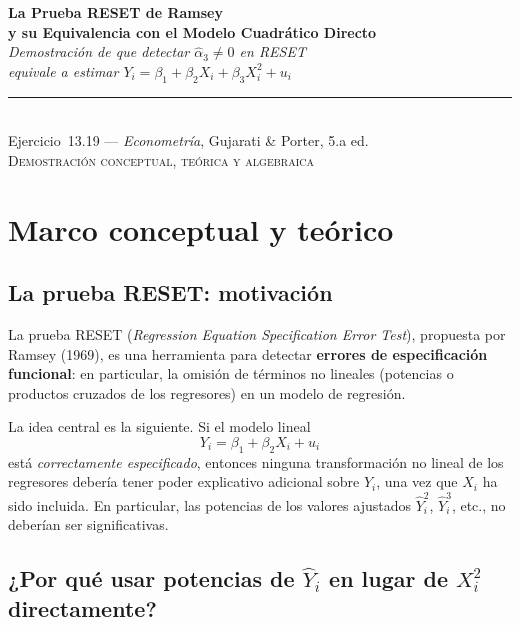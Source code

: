 \documentclass[12pt, letterpaper]{article}
\begin{document}
\begin{center}
  {\LARGE\bfseries La Prueba RESET de Ramsey}\\[6pt]
  {\LARGE\bfseries y su Equivalencia con el Modelo Cuadrático Directo}\\[12pt]
  {\large\itshape Demostración de que detectar $\hat{\alpha}_3 \neq 0$ en RESET}\\
  {\large\itshape equivale a estimar $Y_i = \beta_1 + \beta_2 X_i + \beta_3 X_i^2 + u_i$}\\[14pt]
  \rule{0.55\linewidth}{0.6pt}\\[8pt]
  {\normalsize Ejercicio~13.19 --- \textit{Econometría}, Gujarati \& Porter, 5.a ed.}\\[4pt]
  {\small\textsc{Demostración conceptual, teórica y algebraica}}
\end{center}

\vspace{10pt}

\section{Marco conceptual y teórico}

\subsection{La prueba RESET: motivación}

La prueba RESET (\textit{Regression Equation Specification Error Test}),
propuesta por Ramsey (1969), es una herramienta para detectar
\textbf{errores de especificación funcional}: en particular, la omisión
de términos no lineales (potencias o productos cruzados de los regresores)
en un modelo de regresión.

La idea central es la siguiente. Si el modelo lineal
\begin{equation}
  Y_i = \beta_1 + \beta_2 X_i + u_i
  \label{eq:original}
\end{equation}
está \emph{correctamente especificado}, entonces ninguna transformación
no lineal de los regresores debería tener poder explicativo adicional
sobre $Y_i$, una vez que $X_i$ ha sido incluida. En particular, las
potencias de los valores ajustados $\hat{Y}_i^2$, $\hat{Y}_i^3$, etc.,
no deberían ser significativas.

\subsection{¿Por qué usar potencias de $\hat{Y}_i$ en lugar de $X_i^2$ directamente?}
\end{document}
